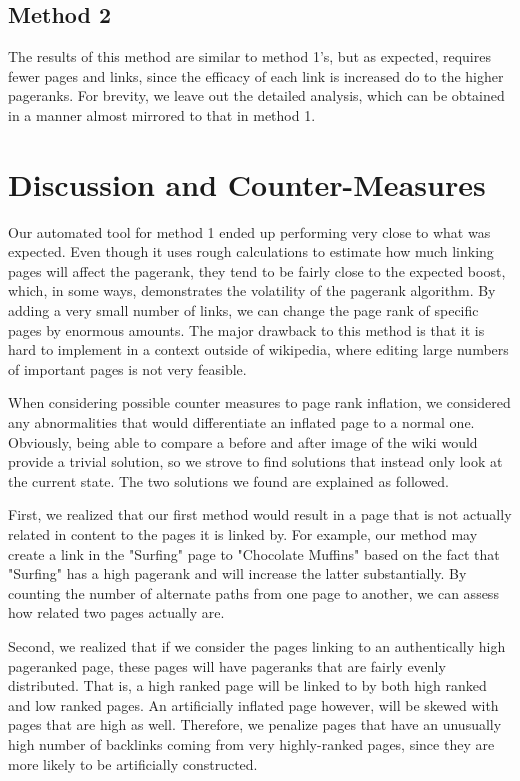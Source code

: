 \documentclass{article}
\begin{document}
\subsection*{Method 2}
The results of this method are similar to method 1's, but as expected, requires
fewer pages and links, since the efficacy of each link is increased do to the
higher pageranks. For brevity, we leave out the detailed analysis, which can be
obtained in a manner almost mirrored to that in method 1.

\section*{Discussion and Counter-Measures}

Our automated tool for method 1 ended up performing very close to what was
expected. Even though it uses rough calculations to estimate how much linking
pages will affect the pagerank, they tend to be fairly close to the expected
boost, which, in some ways, demonstrates the volatility of the pagerank
algorithm. By adding a very small number of links, we can change the page rank
of specific pages by enormous amounts. The major drawback to this method is that
it is hard to implement in a context outside of wikipedia, where editing large
numbers of important pages is not very feasible.

When considering possible counter measures to page rank inflation, we considered
any abnormalities that would differentiate an inflated page to a normal one.
Obviously, being able to compare a before and after image of the wiki would
provide a trivial solution, so we strove to find solutions that instead only
look at the current state. The two solutions we found are explained as followed.

First, we realized that our first method would result in a page that is not
actually related in content to the pages it is linked by. For example, our
method may create a link in the "Surfing" page to "Chocolate Muffins" based on
the fact that "Surfing" has a high pagerank and will increase the latter
substantially. By counting the number of alternate paths from one page to
another, we can assess how related two pages actually are.

Second, we realized that if we consider the pages linking to an authentically
high pageranked page, these pages will have pageranks that are fairly evenly
distributed. That is, a high ranked page will be linked to by both high ranked
and low ranked pages. An artificially inflated page however, will be skewed with
pages that are high as well. Therefore, we penalize pages that have an unusually
high number of backlinks coming from very highly-ranked pages, since they are
more likely to be artificially constructed.
\end{document}
